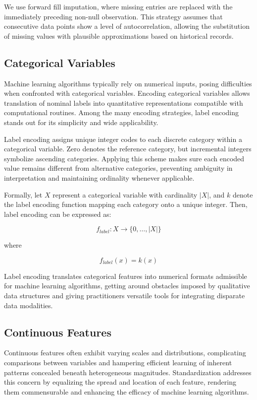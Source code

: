 \documentclass[10pt]{extarticle}
\begin{document}
We use forward fill imputation, where missing entries are replaced with the immediately preceding non-null observation. This strategy assumes that consecutive data points show a level of autocorrelation, allowing the substitution of missing values with plausible approximations based on historical records.

\subsection{Categorical Variables}

Machine learning algorithms typically rely on numerical inputs, posing difficulties when confronted with categorical variables. Encoding categorical variables allows translation of nominal labels into quantitative representations compatible with computational routines. Among the many encoding strategies, label encoding stands out for its simplicity and wide applicability.

Label encoding assigns unique integer codes to each discrete category within a categorical variable. Zero denotes the reference category, but incremental integers symbolize ascending categories. Applying this scheme makes sure each encoded value remains different from alternative categories, preventing ambiguity in interpretation and maintaining ordinality whenever applicable.

Formally, let \(X\) represent a categorical variable with cardinality \(\left|X\right|\), and \(k\) denote the label encoding function mapping each category onto a unique integer. Then, label encoding can be expressed as:

\[
f_{label}: X \rightarrow \{0, \ldots , \left|X\right|\}
\]

where

\[
f_{label}(x) = k(x)
\]

Label encoding translates categorical features into numerical formats admissible for machine learning algorithms, getting around obstacles imposed by qualitative data structures and giving practitioners versatile tools for integrating disparate data modalities.

\subsection{Continuous Features}

Continuous features often exhibit varying scales and distributions, complicating comparisons between variables and hampering efficient learning of inherent patterns concealed beneath heterogeneous magnitudes. Standardization addresses this concern by equalizing the spread and location of each feature, rendering them commensurable and enhancing the efficacy of machine learning algorithms.
\end{document}
